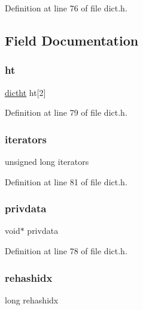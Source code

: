 Definition at line 76 of file dict.\+h.



\subsection{Field Documentation}
\mbox{\label{structdict_ac1f889148f33e6ade337231d349f3e60}} 
\subsubsection{\texorpdfstring{ht}{ht}}
{\footnotesize\ttfamily \hyperlink{structdictht}{dictht} ht\mbox{[}2\mbox{]}}



Definition at line 79 of file dict.\+h.

\mbox{\label{structdict_a36dec5053bd1001c3ffea08aba76ce95}} 
\subsubsection{\texorpdfstring{iterators}{iterators}}
{\footnotesize\ttfamily unsigned long iterators}



Definition at line 81 of file dict.\+h.

\mbox{\label{structdict_ac5df247494dd66a10946e2d67e56b2a1}} 
\subsubsection{\texorpdfstring{privdata}{privdata}}
{\footnotesize\ttfamily void$\ast$ privdata}



Definition at line 78 of file dict.\+h.

\mbox{\label{structdict_a5bd2593dd4365889f62bfd2481287311}} 
\subsubsection{\texorpdfstring{rehashidx}{rehashidx}}
{\footnotesize\ttfamily long rehashidx}




